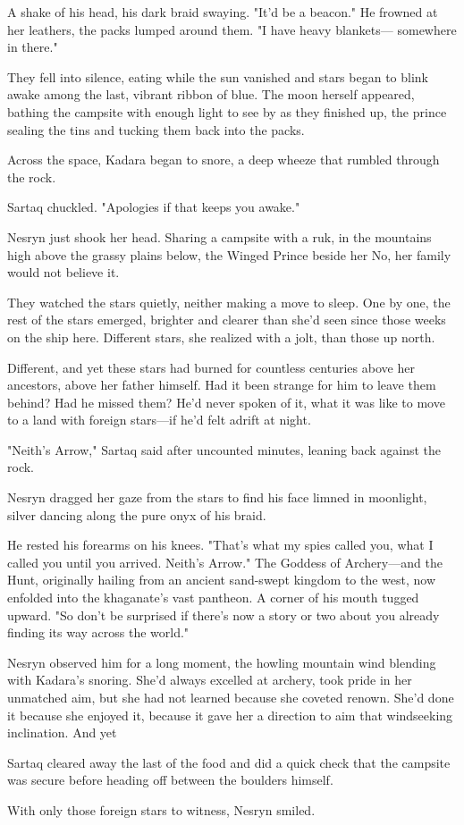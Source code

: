 A shake of his head, his dark braid swaying. "It'd be a beacon." He frowned at her leathers, the packs lumped around them. "I have heavy blankets--- somewhere in there."

They fell into silence, eating while the sun vanished and stars began to blink awake among the last, vibrant ribbon of blue. The moon herself appeared, bathing the campsite with enough light to see by as they finished up, the prince sealing the tins and tucking them back into the packs.

Across the space, Kadara began to snore, a deep wheeze that rumbled through the rock.

Sartaq chuckled. "Apologies if that keeps you awake."

Nesryn just shook her head. Sharing a campsite with a ruk, in the mountains high above the grassy plains below, the Winged Prince beside her  No, her family would not believe it.

They watched the stars quietly, neither making a move to sleep. One by one, the rest of the stars emerged, brighter and clearer than she'd seen since those weeks on the ship here. Different stars, she realized with a jolt, than those up north.

Different, and yet these stars had burned for countless centuries above her ancestors, above her father himself. Had it been strange for him to leave them behind? Had he missed them? He'd never spoken of it, what it was like to move to a land with foreign stars---if he'd felt adrift at night.

"Neith's Arrow," Sartaq said after uncounted minutes, leaning back against the rock.

Nesryn dragged her gaze from the stars to find his face limned in moonlight, silver dancing along the pure onyx of his braid.

He rested his forearms on his knees. "That's what my spies called you, what I called you until you arrived. Neith's Arrow." The Goddess of Archery---and the Hunt, originally hailing from an ancient sand-swept kingdom to the west, now enfolded into the khaganate's vast pantheon. A corner of his mouth tugged upward. "So don't be surprised if there's now a story or two about you already finding its way across the world."

Nesryn observed him for a long moment, the howling mountain wind blending with Kadara's snoring. She'd always excelled at archery, took pride in her unmatched aim, but she had not learned because she coveted renown. She'd done it because she enjoyed it, because it gave her a direction to aim that windseeking inclination. And yet 

Sartaq cleared away the last of the food and did a quick check that the campsite was secure before heading off between the boulders himself.

With only those foreign stars to witness, Nesryn smiled.

